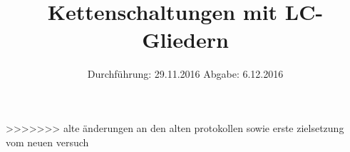 


\subject{V356}
\title{Kettenschaltungen mit LC-Gliedern}
\date{
	Durchführung: 29.11.2016
	\hspace{4em}
	Abgabe: 6.12.2016
}


	\maketitle
	\newpage
	\tableofcontents
	\newpage
	
	
	
	
	
	\newpage
	
	\printbibliography

>>>>>>> alte änderungen an den alten protokollen sowie erste zielsetzung vom neuen versuch
